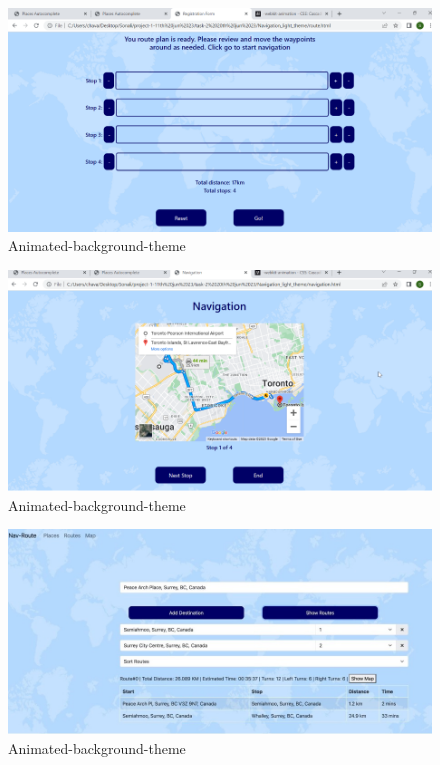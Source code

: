 \documentclass{article}
\begin{document}
\begin{figure}
  \centering
  \includegraphics[width=1\textwidth]{NithishFinal/Picture7.png}
  \caption{Animated-background-theme }
  \label{fig:example}
\end{figure}

\begin{figure}
  \centering
  \includegraphics[width=1\textwidth]{NithishFinal/Picture8.png}
  \caption{Animated-background-theme }
  \label{fig:example}
\end{figure}

\begin{figure}
  \centering
  \includegraphics[width=1\textwidth]{NithishFinal/Picture9.jpg}
  \caption{Animated-background-theme }
  \label{fig:example}
\end{figure}
\end{document}
